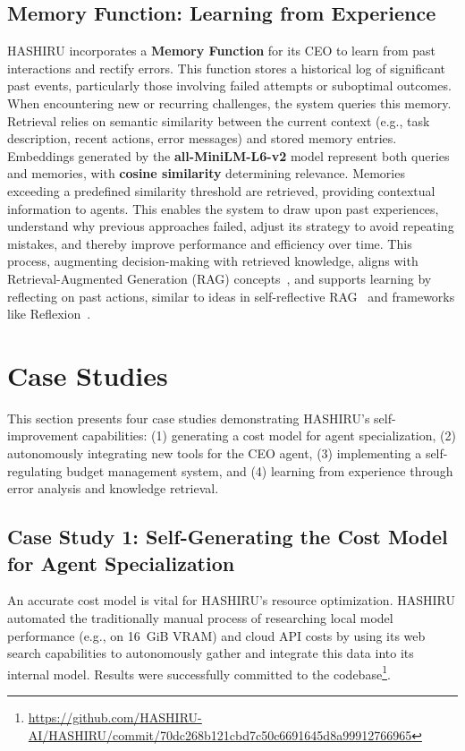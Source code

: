 \documentclass[conference]{IEEEtran}
\begin{document}
\subsection{Memory Function: Learning from Experience}
\label{subsec:memory}

HASHIRU incorporates a \textbf{Memory Function} for its CEO to learn from past interactions and rectify errors. This function stores a historical log of significant past events, particularly those involving failed attempts or suboptimal outcomes. When encountering new or recurring challenges, the system queries this memory. Retrieval relies on semantic similarity between the current context (e.g., task description, recent actions, error messages) and stored memory entries. Embeddings generated by the \textbf{all-MiniLM-L6-v2} model \cite{wang2020minilmdeepselfattentiondistillation} represent both queries and memories, with \textbf{cosine similarity} determining relevance. Memories exceeding a predefined similarity threshold are retrieved, providing contextual information to agents. This enables the system to draw upon past experiences, understand why previous approaches failed, adjust its strategy to avoid repeating mistakes, and thereby improve performance and efficiency over time. This process, augmenting decision-making with retrieved knowledge, aligns with Retrieval-Augmented Generation (RAG) concepts~\cite{lewis2021retrievalaugmentedgenerationknowledgeintensivenlp}, and supports learning by reflecting on past actions, similar to ideas in self-reflective RAG~\cite{asai2023self} and frameworks like Reflexion~\cite{shinn2023reflexion}.

\section{Case Studies}
\label{sec:casestudies}
This section presents four case studies demonstrating HASHIRU's self-improvement capabilities: (1) generating a cost model for agent specialization, (2) autonomously integrating new tools for the CEO agent, (3) implementing a self-regulating budget management system, and (4) learning from experience through error analysis and knowledge retrieval.

\subsection{Case Study 1: Self-Generating the Cost Model for Agent Specialization}
\label{sec:casestudy1_costmodel}
An accurate cost model is vital for HASHIRU's resource optimization. HASHIRU automated the traditionally manual process of researching local model performance (e.g., on 16~GiB VRAM) and cloud API costs by using its web search capabilities to autonomously gather and integrate this data into its internal model. Results were successfully committed to the codebase\footnote{\url{https://github.com/HASHIRU-AI/HASHIRU/commit/70dc268b121cbd7c50c6691645d8a99912766965}}.
\end{document}
